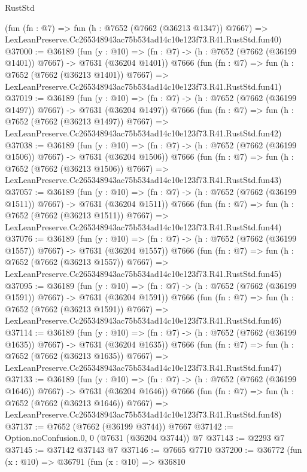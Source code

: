 \begin{lexlean}{RustStd}
\begin{coremodule}
    (fun (fn : @7) =>
    fun (h : @7652 (@7662 (@36213 @1347)) @7667) =>
    LexLeanPreserve.Cc265348943ac75b534ad14c10e123f73.R41.RustStd.fun40)
@37000 := @36189
    (fun (y : @10) => (fn : @7) -> (h : @7652 (@7662 (@36199 @1401)) @7667) -> @7631 (@36204 @1401))
    @7666
    (fun (fn : @7) =>
    fun (h : @7652 (@7662 (@36213 @1401)) @7667) =>
    LexLeanPreserve.Cc265348943ac75b534ad14c10e123f73.R41.RustStd.fun41)
@37019 := @36189
    (fun (y : @10) => (fn : @7) -> (h : @7652 (@7662 (@36199 @1497)) @7667) -> @7631 (@36204 @1497))
    @7666
    (fun (fn : @7) =>
    fun (h : @7652 (@7662 (@36213 @1497)) @7667) =>
    LexLeanPreserve.Cc265348943ac75b534ad14c10e123f73.R41.RustStd.fun42)
@37038 := @36189
    (fun (y : @10) => (fn : @7) -> (h : @7652 (@7662 (@36199 @1506)) @7667) -> @7631 (@36204 @1506))
    @7666
    (fun (fn : @7) =>
    fun (h : @7652 (@7662 (@36213 @1506)) @7667) =>
    LexLeanPreserve.Cc265348943ac75b534ad14c10e123f73.R41.RustStd.fun43)
@37057 := @36189
    (fun (y : @10) => (fn : @7) -> (h : @7652 (@7662 (@36199 @1511)) @7667) -> @7631 (@36204 @1511))
    @7666
    (fun (fn : @7) =>
    fun (h : @7652 (@7662 (@36213 @1511)) @7667) =>
    LexLeanPreserve.Cc265348943ac75b534ad14c10e123f73.R41.RustStd.fun44)
@37076 := @36189
    (fun (y : @10) => (fn : @7) -> (h : @7652 (@7662 (@36199 @1557)) @7667) -> @7631 (@36204 @1557))
    @7666
    (fun (fn : @7) =>
    fun (h : @7652 (@7662 (@36213 @1557)) @7667) =>
    LexLeanPreserve.Cc265348943ac75b534ad14c10e123f73.R41.RustStd.fun45)
@37095 := @36189
    (fun (y : @10) => (fn : @7) -> (h : @7652 (@7662 (@36199 @1591)) @7667) -> @7631 (@36204 @1591))
    @7666
    (fun (fn : @7) =>
    fun (h : @7652 (@7662 (@36213 @1591)) @7667) =>
    LexLeanPreserve.Cc265348943ac75b534ad14c10e123f73.R41.RustStd.fun46)
@37114 := @36189
    (fun (y : @10) => (fn : @7) -> (h : @7652 (@7662 (@36199 @1635)) @7667) -> @7631 (@36204 @1635))
    @7666
    (fun (fn : @7) =>
    fun (h : @7652 (@7662 (@36213 @1635)) @7667) =>
    LexLeanPreserve.Cc265348943ac75b534ad14c10e123f73.R41.RustStd.fun47)
@37133 := @36189
    (fun (y : @10) => (fn : @7) -> (h : @7652 (@7662 (@36199 @1646)) @7667) -> @7631 (@36204 @1646))
    @7666
    (fun (fn : @7) =>
    fun (h : @7652 (@7662 (@36213 @1646)) @7667) =>
    LexLeanPreserve.Cc265348943ac75b534ad14c10e123f73.R41.RustStd.fun48)
@37137 := @7652 (@7662 (@36199 @3744)) @7667
@37142 := Option.noConfusion.{0, 0} (@7631 (@36204 @3744)) @7
@37143 := @2293 @7
@37145 := @37142 @37143 @7
@37146 := @7665 @7710
@37200 := @36772
    (fun (x : @10) =>
    @36791
      (fun (x : @10) =>
      @36810

\end{coremodule}
\end{lexlean}
